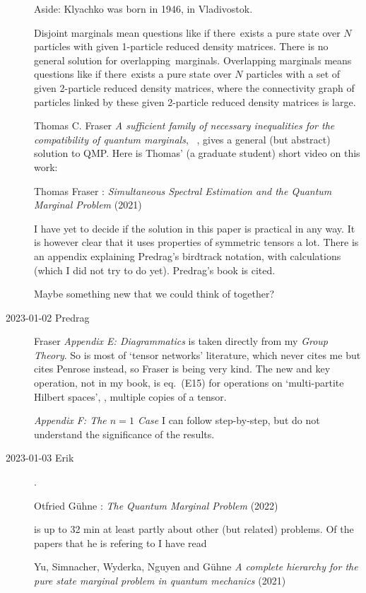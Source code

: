\begin{description}
Aside:
 {Klyachko} was born in 1946, in Vladivostok.

Disjoint marginals
mean questions like if there exists a pure state over $N$ particles with given
1-particle reduced density matrices. There is no general solution for
overlapping marginals. Overlapping marginals means questions like if
there exists a pure state over $N$ particles with a set of given 2-particle
reduced density matrices, where the connectivity graph of particles linked by
these given 2-particle reduced density matrices is large.

Thomas C. Fraser
{\em A sufficient family of necessary inequalities for the compatibility of quantum marginals}, 
,
gives a general (but abstract) solution to QMP. Here is
Thomas' (a graduate student) short video on this work:

 Thomas Fraser :
{\em Simultaneous Spectral Estimation and the Quantum Marginal Problem} (2021)

I have yet to decide if the solution in this paper is practical in any way.
It is however clear that it uses properties of symmetric tensors a lot. There
is an appendix explaining Predrag's birdtrack notation, with calculations
(which I did not try to do yet). Predrag's book is cited.

Maybe something new that we could think of together?

\item[2023-01-02 Predrag]
Fraser {\em Appendix E: Diagrammatics} is taken directly from my
{\em Group Theory}. So is most of `tensor networks' literature,
which never cites me but cites Penrose instead, so Fraser is being very kind.
The new and key operation, not in my book, is eq.~(E15) for operations on
`multi-partite Hilbert spaces', \ie, multiple copies of a tensor.

{\em Appendix F: The $n = 1$ Case} I can follow step-by-step, but do not
understand the significance of the results.

\item[2023-01-03 Erik].

 Otfried G{\"{u}}hne :
{\em The Quantum Marginal Problem} (2022)

is up to 32 min at least partly about other (but
related) problems. Of the papers that he is refering to I have read

Yu, Simnacher, Wyderka, Nguyen and G{\"{u}}hne
{\em A complete hierarchy for the pure state marginal problem in quantum mechanics}
(2021)


\end{description}
